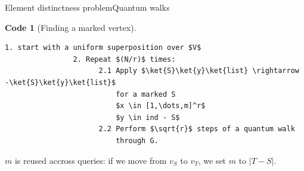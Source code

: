 \documentclass{beamer}
\newtheorem{code}[theorem]{Code}
\begin{document}
\begin{frame}[fragile]{Element distinctness problem}{Quantum walks}       
    \begin{code}[Finding a marked vertex]
    	\begin{flushleft}
        	\vspace{-0.5cm}
			\begin{lstlisting}[mathescape]
				1. start with a uniform superposition over $V$
				2. Repeat $(N/r)$ times:
				      2.1 Apply $\ket{S}\ket{y}\ket{list} \rightarrow -\ket{S}\ket{y}\ket{list}$
				          for a marked S
				          $x \in [1,\dots,m]^r$
				          $y \in ind - S$
				      2.2 Perform $\sqrt{r}$ steps of a quantum walk
				          through G.
			\end{lstlisting}
		\end{flushleft}
    \end{code}
    
    $m$ is reused accross queries: if we move from $v_S$ to $v_T$, we set $m$ to $|T - S|$.
\end{frame}
\end{document}
